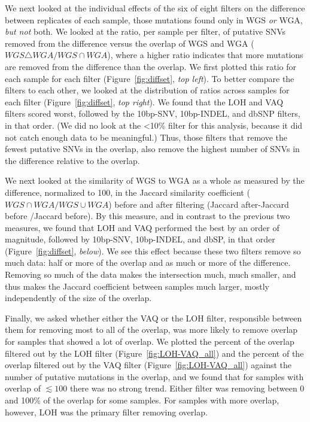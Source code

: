 \documentclass[11 pt]{article} %
\begin{document}
We next looked at the individual effects of the six of eight filters on the difference between replicates of each sample, those mutations found only in WGS \textit{or} WGA, \textit{but not} both. We looked at the ratio, per sample per filter, of putative SNVs removed from the difference versus the overlap of WGS and WGA ($WGS \triangle WGA / WGS \cap WGA$), where a higher ratio indicates that more mutations are removed from the difference than the overlap. We first plotted this ratio for each sample for each filter (Figure~\ref{fig:diffset}, \textit{top left}). To better compare the filters to each other, we looked at the distribution of ratios across samples for each filter (Figure~\ref{fig:diffset}, \textit{top right}). We found that the LOH and VAQ filters scored worst, followed by the 10bp-SNV, 10bp-INDEL, and dbSNP filters, in that order. (We did no look at the <10\% filter for this analysis, because it did not catch enough data to be meaningful.) Thus, those filters that remove the fewest putative SNVs in the overlap, also remove the highest number of SNVs in the difference relative to the overlap.

We next looked at the similarity of WGS to WGA as a whole as measured by the difference, normalized to 100, in the Jaccard similarity coefficient ($WGS \cap WGA / WGS \cup WGA$) before and after filtering (Jaccard after-Jaccard before /Jaccard before). By this measure, and in contrast to the previous two measures, we found that LOH and VAQ performed the best by an order of magnitude, followed by 10bp-SNV, 10bp-INDEL, and dbSP, in that order (Figure~\ref{fig:diffset}, \textit{below}). We see this effect because these two filters remove so much data: half or more of the overlap and as much or more of the difference. Removing so much of the data makes the intersection much, much smaller, and thus makes the Jaccard coefficient between samples much larger, mostly independently of the size of the overlap.

Finally, we asked whether either the VAQ or the LOH filter, responsible between them for removing most to all of the overlap, was more likely to remove overlap for samples that showed a lot of overlap. We plotted the percent of the overlap filtered out by the LOH filter (Figure~\ref{fig:LOH-VAQ_all}) and the percent of the overlap filtered out by the VAQ filter (Figure~\ref{fig:LOH-VAQ_all}) against the number of putative mutations in the overlap, and we found that for samples with overlap of $\lesssim 100$ there was no strong trend. Either filter was removing between 0 and 100\% of the overlap for some samples. For samples with more overlap, however, LOH was the primary filter removing overlap.   
\end{document}
